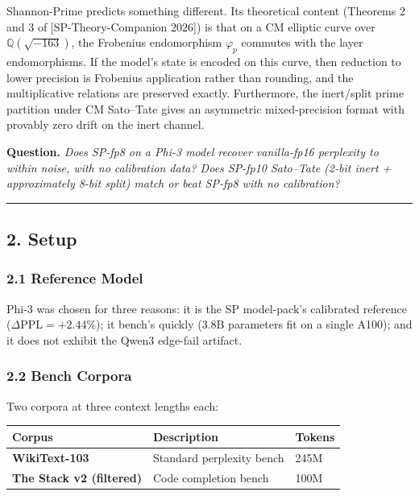 \documentclass[
  11pt,
]{article}
\begin{document}
Shannon-Prime predicts something different. Its theoretical content
(Theorems 2 and 3 of {[}SP-Theory-Companion 2026{]}) is that on a CM
elliptic curve over \(\mathbb{Q}(\sqrt{-163})\), the Frobenius
endomorphism \(\varphi_p\) commutes with the layer endomorphisms. If the
model's state is encoded on this curve, then reduction to lower
precision is Frobenius application rather than rounding, and the
multiplicative relations are preserved exactly. Furthermore, the
inert/split prime partition under CM Sato--Tate gives an asymmetric
mixed-precision format with provably zero drift on the inert channel.

\textbf{Question.} \emph{Does SP-fp8 on a Phi-3 model recover
vanilla-fp16 perplexity to within noise, with no calibration data? Does
SP-fp10 Sato--Tate (2-bit inert + approximately 8-bit split) match or
beat SP-fp8 with no calibration?}

\begin{center}\rule{0.5\linewidth}{0.5pt}\end{center}

\hypertarget{setup}{%
\subsection{2. Setup}\label{setup}}

\hypertarget{reference-model}{%
\subsubsection{2.1 Reference Model}\label{reference-model}}

Phi-3 was chosen for three reasons: it is the SP model-pack's calibrated
reference (\(\Delta\mathrm{PPL} = +2.44\%\)); it bench's quickly (3.8B
parameters fit on a single A100); and it does not exhibit the Qwen3
edge-fail artifact.

\hypertarget{bench-corpora}{%
\subsubsection{2.2 Bench Corpora}\label{bench-corpora}}

Two corpora at three context lengths each:

\begin{longtable}[]{@{}lll@{}}
\toprule
Corpus & Description & Tokens\tabularnewline
\midrule
\endhead
\textbf{WikiText-103} & Standard perplexity bench & 245M\tabularnewline
\textbf{The Stack v2 (filtered)} & Code completion bench &
100M\tabularnewline
\bottomrule
\end{longtable}
\end{document}
